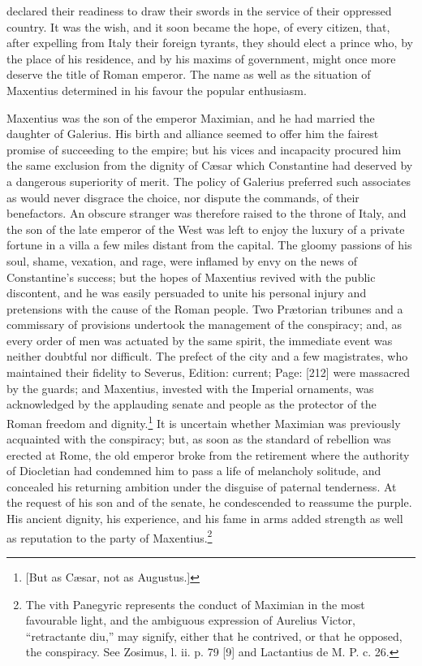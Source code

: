 declared their readiness to draw their swords in the service of their oppressed country. It was the wish, and it soon became the hope, of every citizen, that, after expelling from Italy their foreign tyrants, they should elect a prince who, by the place of his residence, and by his maxims of government, might once more deserve the title of Roman emperor. The name as well as the situation of Maxentius determined in his favour the popular enthusiasm.

Maxentius was the son of the emperor Maximian, and he had married the daughter of Galerius. His birth and alliance seemed to offer him the fairest promise of succeeding to the empire; but his vices and incapacity procured him the same exclusion from the dignity of Cæsar which Constantine had deserved by a dangerous superiority of merit. The policy of Galerius preferred such associates as would never disgrace the choice, nor dispute the commands, of their benefactors. An obscure stranger was therefore raised to the throne of Italy, and the son of the late emperor of the West was left to enjoy the luxury of a private fortune in a villa a few miles distant from the capital. The gloomy passions of his soul, shame, vexation, and rage, were inflamed by envy on the news of Constantine\texthebrew{}’s success; but the hopes of Maxentius revived with the public discontent, and he was easily persuaded to unite his personal injury and pretensions with the cause of the Roman people. Two Prætorian tribunes and a commissary of provisions undertook the management of the conspiracy; and, as every order of men was actuated by the same spirit, the immediate event was neither doubtful nor difficult. The prefect of the city and a few magistrates, who maintained their fidelity to Severus, Edition: current; Page: [212] were massacred by the guards; and Maxentius, invested with the Imperial ornaments, was acknowledged by the applauding senate and people as the protector of the Roman freedom and dignity.\footnote{[But as Cæsar, not as Augustus.]} It is uncertain whether Maximian was previously acquainted with the conspiracy; but, as soon as the standard of rebellion was erected at Rome, the old emperor broke from the retirement where the authority of Diocletian had condemned him to pass a life of melancholy solitude, and concealed his returning ambition under the disguise of paternal tenderness. At the request of his son and of the senate, he condescended to reassume the purple. His ancient dignity, his experience, and his fame in arms added strength as well as reputation to the party of Maxentius.\footnote{The vith Panegyric represents the conduct of Maximian in the most favourable light, and the ambiguous expression of Aurelius Victor, \texthebrew{“}retractante diu,\texthebrew{}” may signify, either that he contrived, or that he opposed, the conspiracy. See Zosimus, l. ii. p. 79 [9] and Lactantius de M. P. c. 26.}

